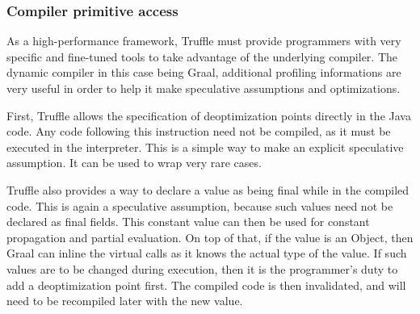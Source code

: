\documentclass[twoside,11pt,a4paper]{article}
\newcommand{\todo}[1]{\textit{TODO: #1}}
\newcommand{\java}[1]{\textsf{#1}}
\newcommand{\jitted}{JITted}
\begin{document}

\subsubsection{Compiler primitive access}

As a high-performance framework, Truffle must provide programmers with very specific and fine-tuned tools to take advantage of the underlying compiler. The dynamic compiler in this case being Graal, additional profiling informations are very useful in order to help it make speculative assumptions and optimizations.

First, Truffle allows the specification of deoptimization points directly in the Java code. Any code following this instruction need not be compiled, as it must be executed in the interpreter. This is a simple way to make an explicit speculative assumption. It can be used to wrap very rare cases.

Truffle also provides a way to declare a value as being final while in the compiled code. This is again a speculative assumption, because such values need not be declared as \java{final} fields. This constant value can then be used for constant propagation and partial evaluation. On top of that, if the value is an \java{Object}, then Graal can inline the virtual calls as it knows the actual type of the value. If such values are to be changed during execution, then it is the programmer's duty to add a deoptimization point first. The compiled code is then invalidated, and will need to be recompiled later with the new value.

\end{document}
